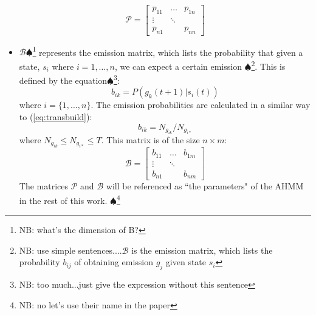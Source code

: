 \documentclass[letterpaper, 10 pt, conference]{ieeeconf}  %
\newcommand\NB[1]{$\spadesuit$\footnote{NB: #1}}
\begin{document}
\begin{itemize}
        \begin{equation}
            \mathcal{P} = 
                    \begin{bmatrix}
                        p_{11} & \dots & p_{1n} \\
                        \vdots & \ddots & \\
                        p_{n1} &    & p_{nn}
                    \end{bmatrix}
        \end{equation}
    \item $\mathcal{B}$\NB{what's the dimension of B?} represents the emission matrix, which lists the probability that given a state, $s_i$ where $i = 1,\ldots,n$, we can expect a certain emission \NB{use simple sentences....$\mathcal{B}$ is the emission matrix, which lists the probability $b_{ij}$ of obtaining emission $g_j$ given state $s_i$}. This is defined by the equation\NB{too much...just give the expression without this sentence}:
        \begin{equation} \label{eq:obsref}
            b_{ik} = P(g_k(t+1) \vert s_i(t))
        \end{equation}
        where $i = \{1,\ldots,n\}$. The emission probabilities are calculated in a similar way to (\ref{eq:transbuild}):
        \begin{equation} \label{eq:obsbuild}
            b_{ik} = N_{g_{ik}}/N_{g_{i*}}
        \end{equation} 
        where $N_{g_{ik}} \leq N_{g_{i*}} \leq T$. This matrix is of the size $n\times m$:
        \begin{equation}
            \mathcal{B} = 
                    \begin{bmatrix}
                        b_{11} & \dots & b_{1m} \\
                        \vdots & \ddots & \\
                        b_{n1} &    & b_{nm}
                    \end{bmatrix}
        \end{equation}
        The matrices $\mathcal{P}$ and $\mathcal{B}$ will be referenced as ``the parameters" of the AHMM in the rest of this work. \NB{no let's use their name in the paper}
\end{itemize}
\end{document}
